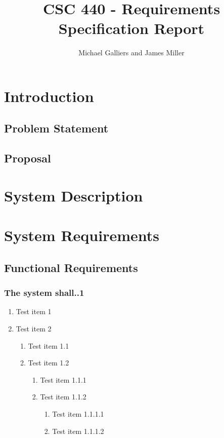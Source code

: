 \documentclass[12pt]{article}
\author{Michael Galliers and James Miller}
\title{CSC 440 - Requirements Specification Report}
\newenvironment{requirement}[1]
{
    \renewcommand{\thesubsubsection}{R\arabic{subsubsection}.}
    \renewcommand{\labelenumi}{
        \arabic{subsubsection}.\arabic{enumi}
    }
    \renewcommand{\labelenumii}{
        \arabic{subsubsection}.\arabic{enumi}.\arabic{enumii}
    }
    \renewcommand{\labelenumiii}{
        \arabic{subsubsection}.\arabic{enumi}.\arabic{enumii}.\arabic{enumiii}
    }
    \renewcommand{\labelenumiv}{
        \arabic{subsubsection}.\arabic{enumi}.\arabic{enumii}.\arabic{enumiii}.\arabic{enumiv}
    }
    \subsubsection{#1}
}
{}
\begin{document}
\begin{titlepage}
\maketitle
\end{titlepage}

\newpage
    \tableofcontents
\newpage

\section{Introduction}
\subsection{Problem Statement}

\subsection{Proposal}

\section{System Description}

\section{System Requirements}
\subsection{Functional Requirements}
\begin{requirement}{The system shall..1}


\begin{enumerate}
    \item Test item 1
    \item Test item 2
    \begin{enumerate}
        \item Test item 1.1
        \item Test item 1.2
        \begin{enumerate}
            \item Test item 1.1.1
            \item Test item 1.1.2
            \begin{enumerate}
                \item Test item 1.1.1.1
                \item Test item 1.1.1.2
            \end{enumerate}
        \end{enumerate}
    \end{enumerate}
\end{enumerate}


\end{requirement}
\end{document}
